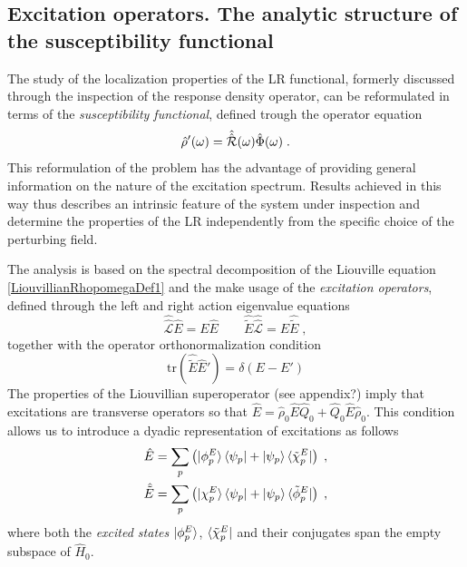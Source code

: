 \documentclass[reprint,aps,prb]{revtex4-1}
\newcommand{\be}{\begin{equation}}
\newcommand{\ee}{\end{equation}}
\newcommand{\nn}{\notag}
\newcommand{\qq}{\qquad}
\newcommand{\lb}{\label}
\newcommand{\op}[1]{\hat {#1}}
\newcommand{\sop}[1]{\op{\op {#1}}}
\newcommand{\trace}[1]{\mathrm{tr}\left(#1\right)}
\newcommand{\dmnot}{\op{\rho}_0}
\newcommand{\dm}{\op{\rho}}
\newcommand{\hnot}{\op{H}_0}
\newcommand{\Liouv}{\sop{\mathcal L}}
\begin{document}
\subsection{Excitation operators. The analytic structure of the susceptibility functional} %

The study of the localization properties of the LR functional, formerly discussed through the inspection of the response density operator, can be reformulated in terms of the 
\emph{susceptibility functional}, defined trough the operator equation  
\be\lb{SusceptibilityDef1}
\dm'(\omega) = \sop{{\cal R}}(\omega) \op\Phi(\omega) \;. 
\ee
This reformulation of the problem has the advantage of providing general information on the nature of the excitation spectrum. Results achieved in this way thus describes an intrinsic 
feature of the system under inspection and determine the properties of the LR independently from the specific choice of the perturbing field. 

The analysis is based on the spectral decomposition of the Liouville equation \eqref{LiouvillianRhopomegaDef1} and the make usage of the \emph{excitation operators}, defined through the 
left and right action eigenvalue equations 
\be\lb{ExcitationOperatorsDef1}
\Liouv \op E = E \op E \qq \op{\tilde E} \Liouv = E \op{\tilde E} \;,
\ee
together with the operator orthonormalization condition %
\be\lb{orthoExcitatioOpDef1}
\trace{\op{\tilde E}\op E'} = \delta(E-E')
\ee
The properties of the Liouvillian superoperator (see appendix?) imply that excitations are transverse 
operators so that $\op E = \dmnot\op E\op Q_0 + \op Q_0\op E\dmnot$. This condition allows us to introduce a dyadic representation of excitations as follows
\begin{align}\lb{ExcitationOperatorsDef2}
\op E &= \sum_p \left( \ket{\phi^E_p}\bra{\psi_p} + \ket{\psi_p} \bra{\tilde\chi^E_p}\right)\;, \nn \\
\op{\tilde E} &= \sum_p \left( \ket{\chi^E_p}\bra{\psi_p} + \ket{\psi_p} \bra{\tilde\phi^E_p}\right)\;,
\end{align}
where both the \emph{excited states} $\ket{\phi^E_p}$, $\bra{\tilde\chi^E_p}$ and their conjugates span the empty subspace of $\hnot$. 
\end{document}
